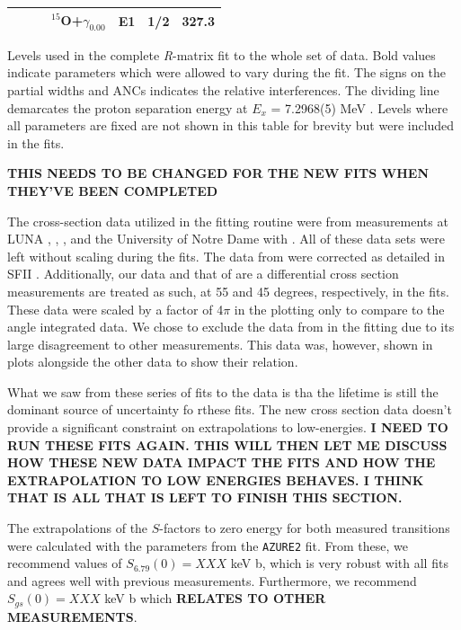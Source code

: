 \begin{table}[]
\begin{center}
\begin{threeparttable}
\begin{tabular}{c  c  c  c  c  c  c}
	&	&	&	$^{15}$O+$\gamma_{0.00}$	&	E1	&	1/2	&	\textbf{327.3}	\\
\bottomrule
\end{tabular}
\begin{tablenotes}
\small 
\item Levels used in the complete \textit{R}-matrix fit to the whole set of data. Bold values indicate parameters which were allowed to vary during the fit. The signs on the partial widths and ANCs indicates the relative interferences. The dividing line demarcates the proton separation energy at $E_x$ = 7.2968(5) MeV \cite{Ajzenberg-Selove1991}. Levels where all parameters are fixed are not shown in this table for brevity but were included in the fits.
\item \textbf{THIS NEEDS TO BE CHANGED FOR THE NEW FITS WHEN THEY'VE BEEN COMPLETED}
\end{tablenotes}
\end{threeparttable}
\label{table: fitParamsFullFit}
\end{center}
\end{table}  



The cross-section data utilized in the fitting routine were from measurements at LUNA \cite{Formicola2004, Imbriani2005, Marta2008, Marta2011}, \citet{Runkle2005}, \citet{Schroder1987}, and the University of Notre Dame with \citet{Li2016}. All of these data sets were left without scaling during the fits. The data from \citet{Schroder1987} were corrected as detailed in SFII \cite{Adelberger2011}. Additionally, our data and that of \citet{Li2016} are a differential cross section measurements are treated as such, at 55 and 45 degrees, respectively, in the fits. These data were scaled by a factor of 4$\pi$ in the plotting only to compare to the angle integrated data. We chose to exclude the data from \citet{Wagner2018} in the fitting due to its large disagreement to other measurements. This data was, however, shown in plots alongside the other data to show their relation.

What we saw from these series of fits to the data is tha the lifetime is still the dominant source of uncertainty fo rthese fits. The new cross section data doesn't provide a significant constraint on extrapolations to low-energies. 
\textbf{I NEED TO RUN THESE FITS AGAIN. THIS WILL THEN LET ME DISCUSS HOW THESE NEW DATA IMPACT THE FITS AND HOW THE EXTRAPOLATION TO LOW ENERGIES BEHAVES. I THINK THAT IS ALL THAT IS LEFT TO FINISH THIS SECTION.}

The extrapolations of the $S$-factors to zero energy for both measured transitions were calculated with the parameters from the \texttt{AZURE2} fit. From these, we recommend values of $S_{6.79}(0) = XXX$ keV b, which is very robust with all fits and agrees well with previous measurements. Furthermore, we recommend $S_{gs}(0) = XXX$ keV b which \textbf{RELATES TO OTHER MEASUREMENTS}. 


%
% 
% 

